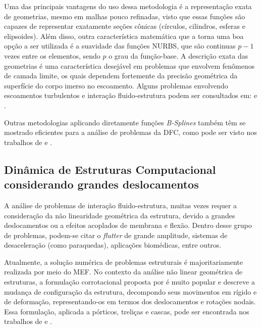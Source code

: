 Uma das principais vantagens do uso dessa metodologia é a representação exata de geometrias, mesmo em malhas pouco refinadas, visto que essas funções são capazes de representar exatamente seções cônicas  (círculos, cilindros, esferas e elipsoides). Além disso, outra característica matemática que a torna uma boa opção a ser utilizada é a suavidade das funções NURBS, que são continuas $p-1$ vezes entre os elementos, sendo $p$ o grau da função-base. A descrição exata das geometrias é uma característica desejável em problemas que envolvem fenômenos de camada limite, os quais dependem fortemente da precisão geométrica da superfície do corpo imerso no escoamento. Alguns problemas envolvendo escoamentos turbulentos e interação fluido-estrutura podem ser consultados em:  e .
	
Outras metodologias aplicando diretamente funções \textit{B-Splines} também têm se mostrado eficientes para a análise de problemas da DFC, como pode ser visto nos trabalhos de  e .


\subsection{Dinâmica de Estruturas Computacional considerando grandes deslocamentos}
\label{csdsection}

A análise de problemas de interação fluido-estrutura, muitas vezes requer a consideração da não linearidade geométrica da estrutura, devido a grandes deslocamentos ou a efeitos acoplados de membrana e flexão. Dentro desse grupo de problemas, podem-se citar o \textit{flutter} de grande amplitude, sistemas de desaceleração (como paraquedas), aplicações biomédicas, entre outros.

Atualmente, a solução numérica de problemas estruturais é majoritariamente realizada por meio do MEF. No contexto da análise não linear geométrica de estruturas, a formulação corrotacional proposta por  é muito popular e descreve a mudança de configuração da estrutura, decompondo seus movimentos em rígido e de deformação, representando-os em termos dos deslocamentos e rotações nodais. Essa formulação, aplicada a pórticos, treliças e cascas, pode ser encontrada nos trabalhos de  e .

